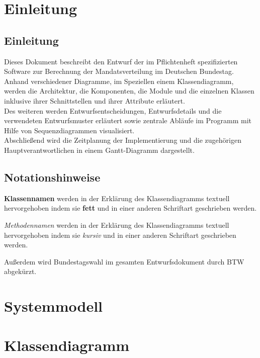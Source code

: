 \documentclass[12pt,a4paper,titlepage]{article}
\newcommand{\myma}{\fontfamily{pcr}\selectfont \textbf}
\newcommand{\mymo}{\fontfamily{pcr}\selectfont \textit}
\begin{document}
\section{Einleitung}
\subsection{Einleitung}
Dieses Dokument beschreibt den Entwurf der im Pflichtenheft spezifizierten Software zur Berechnung der Mandatsverteilung im Deutschen Bundestag.\\
Anhand verschiedener Diagramme, im Speziellen einem Klassendiagramm, werden die Architektur, die Komponenten, die Module und die einzelnen Klassen inklusive ihrer Schnittstellen und ihrer Attribute erläutert.\\
Des weiteren werden Entwurfsentscheidungen, Entwurfsdetails und die verwendeten Entwurfsmuster erläutert sowie zentrale Abläufe im Programm mit Hilfe von Sequenzdiagrammen visualisiert.\\
Abschließend wird die Zeitplanung der Implementierung und die zugehörigen Hauptverantwortlichen in einem Gantt-Diagramm dargestellt.    
\subsection{Notationshinweise}
{\myma{Klassennamen}} werden in der Erklärung des Klassendiagramms textuell hervorgehoben indem sie \textbf{fett} und in einer anderen Schriftart geschrieben werden.\newline

{\mymo{Methodennamen}} werden in der Erklärung des Klassendiagramms textuell hervorgehoben indem sie \textit{kursiv} und in einer anderen Schriftart geschrieben werden.\newline

Außerdem wird Bundestagswahl im gesamten Entwurfsdokument durch BTW abgekürzt.
\newpage

\section{Systemmodell}
\newpage
\section{Klassendiagramm}
\end{document}
